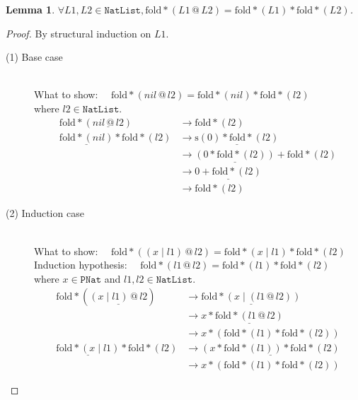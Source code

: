 \documentclass[12pt, a4paper]{article}
\newtheorem{lemma}[theorem]{Lemma}
\newcommand{\rel}[1]{\mathrel{#1}}
\newcommand{\rmx}[1]{\mathrm{#1}}
\newcommand{\larrow}{\longrightarrow}
\newcommand{\under}{\underline}
\begin{document}
\begin{lemma}
\label{lm1}
$\forall L1, L2 \in \mathtt{NatList}, \rmx{fold*}(L1 \rel{@} L2) = \rmx{fold*}(L1) \rel{*} \rmx{fold*}(L2)$.
\end{lemma}
\begin{proof}
By structural induction on $L1$.

\begin{description}

\item[(1) Base case]~\\
What to show: $\quad\rmx{fold*}(nil \rel{@} l2) = \rmx{fold*}(nil) \rel{*} \rmx{fold*}(l2)$\\
where $l2 \in \mathtt{NatList}$.
\begin{align*}
\rmx{fold*}(\under{nil \rel{@} l2}) 
	&\larrow \rmx{fold*}(l2) \tag{by @1} \\
\under{\rmx{fold*}(nil)} \rel{*} \rmx{fold*}(l2) 
	&\larrow \under{\rmx{s}(0) \rel{*} \rmx{fold*}(l2)} \tag{by fold*-1} \\
	&\larrow \under{(0 \rel{*} \rmx{fold*}(l2))} \rel{+} \rmx{fold*}(l2) \tag{by *2} \\
	&\larrow \under{0 \rel{+} \rmx{fold*}(l2)} \tag{by *1} \\
	&\larrow \rmx{fold*}(l2) \tag{by +1}
\end{align*}

\item[(2) Induction case]~\\
What to show: $\quad\rmx{fold*}((x \rel{|} l1) \rel{@} l2) = \rmx{fold*}(x \rel{|} l1) \rel{*} \rmx{fold*}(l2)$\\
Induction hypothesis: $\quad\rmx{fold*}(l1 \rel{@} l2) = \rmx{fold*}(l1) \rel{*} \rmx{fold*}(l2)$\\
where $x \in \mathtt{PNat}$ and $l1, l2 \in \mathtt{NatList}$.
\begin{align*}
\rmx{fold*}(\under{(x \rel{|} l1) \rel{@} l2}) 
	&\larrow \under{\rmx{fold*}(x \rel{|} (l1 \rel{@} l2))} \tag{by @2} \\
	&\larrow x \rel{*} \under{\rmx{fold*}(l1 \rel{@} l2)} \tag{by fold*-2} \\
	&\larrow x \rel{*} (\rmx{fold*}(l1) \rel{*} \rmx{fold*}(l2)) \tag{by IH} \\
\under{\rmx{fold*}(x \rel{|} l1)} \rel{*} \rmx{fold*}(l2) 
	&\larrow \under{(x \rel{*} \rmx{fold*}(l1)) \rel{*} \rmx{fold*}(l2)} \tag{by fold*-2} \\
	&\larrow x \rel{*} (\rmx{fold*}(l1) \rel{*} \rmx{fold*}(l2)) \tag{by assoc*}
\end{align*}
\end{description}

\end{proof}
\end{document}
